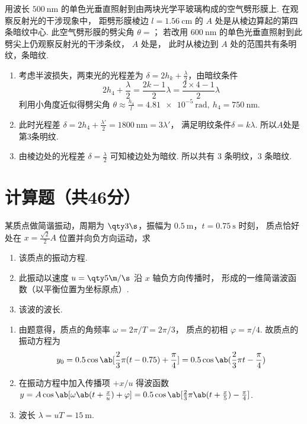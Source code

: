 \begin{problem}[本题4分]
  用波长 $\qty{500}\nm$ 的单色光垂直照射到由两块光学平玻璃构成的空气劈形膜上.
  在观察反射光的干涉现象中，
  距劈形膜棱边 $l = \qty{1.56}\cm$ 的 $A$ 处是从棱边算起的第四条暗纹中心.
  此空气劈形膜的劈尖角 $\theta = $；
  若改用 $\qty{600}\nm$ 的单色光垂直照射到此劈尖上仍观察反射光的干涉条纹，
  $A$ 处是，
  此时从棱边到 $A$ 处的范围共有条明纹，条暗纹.
\end{problem}
\scratch[2ex]
\begin{solution}\leavevmode
  \begin{enumerate}
    \item 考虑半波损失，两束光的光程差为 $\delta = 2h_k + \frac\lambda2$，由暗纹条件
      \[
          2h_4 + \frac\lambda2 = \frac{2k - 1}{2}\lambda
        = \frac{2 \times 4 - 1}{2}\lambda
      \]
      利用小角度近似得劈尖角
      $\theta\approx\frac{h_4}{l} = \qty{4.81e-5}\radian,~ h_4 = \qty{750}\nm$.
    \item 此时光程差
    $\delta = 2h_4 + \frac{\lambda'}{2} = \qty{1800}\nm = 3\lambda'$，
    满足明纹条件$\delta = k\lambda$. 所以$A$处是第3条明纹.
    \item 由棱边处的光程差 $\delta = \frac\lambda2$ 可知棱边处为暗纹.
    所以共有 $3$ 条明纹，$3$ 条暗纹.
  \end{enumerate}
\end{solution}

\section{计算题（共46分）}

\begin{problem}[本题5分]
  某质点做简谐振动，周期为 $\qty3\s$，振幅为 $\qty{0.5}\m$，$t = \qty{0.75}\s$ 时刻，
  质点恰好处在 $x = \frac{\sqrt2}{2}A$ 位置并向负方向运动，求
  \begin{enumerate}
    \item 该质点的振动方程.
    \item 此振动以速度 $u = \qty5{\m/\s}$ 沿 $x$ 轴负方向传播时，
    形成的一维简谐波函数（以平衡位置为坐标原点）.
    \item 该波的波长.
  \end{enumerate}
\end{problem}
\scratch[1em]
\begin{solution}\leavevmode
  \begin{enumerate}
    \item 由题意得，质点的角频率 $\omega = 2\pi/T = 2\pi/3$，
    质点的初相 $\varphi = \pi/4$. 故质点的振动方程为
    \[
      y_0 = 0.5\cos\ab[\frac23\pi(t - 0.75) + \frac\pi4]
          = 0.5\cos\ab(\frac23\pi t - \frac\pi4)\]
    \item 在振动方程中加入传播项 $+x/u$ 得波函数
    $ y = A\cos\ab[\omega\ab(t + \frac xu) + \varphi]
        = 0.5\cos\ab[\frac23\pi\ab(t + \frac x5) - \frac\pi4]$.
    \item 波长 $\lambda = uT = \qty{15}\m$.
  \end{enumerate}
\end{solution}

